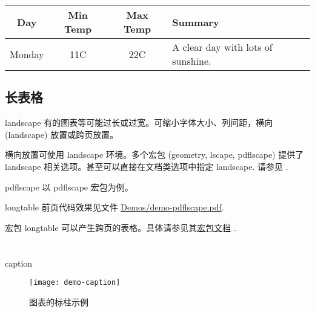 \documentclass[]{ctexbeamer}
\begin{document}
\begin{frame}[fragile]
\begin{vertlst}
\begin{tabular}{ *{3}{| c} | p{3.5cm} |}
\hline
Day & Min Temp & Max Temp & Summary \\ \hline
Monday & 11C & 22C & A clear day with lots of sunshine. \\ \hline
\end{tabular}
\end{vertlst}
\end{frame}


\subsection{长表格}
\begin{frame}{landscape}
有的图表等可能过长或过宽。可缩小字体大小、列间距，横向 (landscape) 放置或跨页放置。

横向放置可使用 landscape 环境。多个宏包 (geometry, lscape, pdflscape) 提供了 landscape 相关选项。甚至可以直接在文档类选项中指定 landscape. 请参见 \cite{texblog-table}.
\end{frame}

\begin{frame}[fragile]{pdflscape}
以 pdflscape 宏包为例。
\end{frame}


\begin{frame}{longtable}
前页代码效果见文件 \href{run:Demos/demo-pdflscape.pdf}{Demos/demo-pdflscape.pdf}.

宏包 longtable 可以产生跨页的表格。具体请参见其\href{http://mirrors.ctan.org/macros/latex/required/tools/longtable.pdf}{宏包文档} \cite{longtable}.
\end{frame}


\section{}
% 
\begin{frame}[fragile]{caption}
\end{frame}


\begin{frame}
\begin{figure}[]
  \centering
  \texttt{[image: demo-caption]}
  \caption{图表的标柱示例}
  \label{demo-caption}
\end{figure}
\end{frame}
\end{document}
